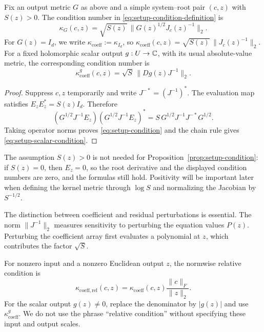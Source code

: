 \begin{proposition}\label{prop:setup-condition}
Fix an output metric $G$ as above and a simple system--root pair $(c,z)$ with
$S(z)>0$. The condition number in \eqref{eq:setup-condition-definition} is
\begin{equation}\label{eq:setup-condition}
 \kappa_G(c,z)=\sqrt{S(z)}\,
       \|G(z)^{1/2}J_c(z)^{-1}\|_2.
\end{equation}
For $G(z)=I_d$, we write $\kappa_{\mathrm{coeff}}:=\kappa_{I_d}$, so
$\kappa_{\mathrm{coeff}}(c,z)=\sqrt{S(z)}\,\|J_c(z)^{-1}\|_2$.
For a fixed holomorphic scalar output $g:U\to\mathbb C$, with its usual absolute-value
metric, the corresponding condition number is
\begin{equation}\label{eq:setup-scalar-condition}
 \kappa_{\mathrm{coeff}}^{g}(c,z)
   =\sqrt S\,\|Dg(z)J^{-1}\|_2.
\end{equation}
\end{proposition}
\begin{proof}
Suppress $c,z$ temporarily and write $J^{-*}=(J^{-1})^*$. The evaluation map
satisfies $E_zE_z^*=S(z)I_d$. Therefore
\[
 (G^{1/2}J^{-1}E_z)(G^{1/2}J^{-1}E_z)^*
   =S\,G^{1/2}J^{-1}J^{-*}G^{1/2}.
\]
Taking operator norms proves \eqref{eq:setup-condition} and the chain rule gives
\eqref{eq:setup-scalar-condition}.
\end{proof}

The assumption $S(z)>0$ is not needed for Proposition~\ref{prop:setup-condition}:
if $S(z)=0$, then $E_z=0$, so the root derivative and the displayed condition
numbers are zero, and the formulas still hold. Positivity will be important
later when defining the kernel metric through $\log S$ and normalizing the
Jacobian by $S^{-1/2}$.

The distinction between coefficient and residual perturbations is essential.
The norm $\|J^{-1}\|_2$ measures sensitivity to perturbing the equation values
$P(z)$. Perturbing the coefficient array first evaluates a polynomial at $z$,
which contributes the factor $\sqrt S$.

For nonzero input and a nonzero Euclidean output $z$, the normwise relative condition is
\begin{equation}\label{eq:setup-relative}
 \kappa_{\mathrm{coeff,rel}}(c,z)
 =\kappa_{\mathrm{coeff}}(c,z)\frac{\|c\|_F}{\|z\|_2}.
\end{equation}
For the scalar output $g(z)\ne0$, replace the denominator by $|g(z)|$ and use
$\kappa_{\mathrm{coeff}}^g$. We do not use the phrase ``relative condition''
without specifying these input and output scales.

